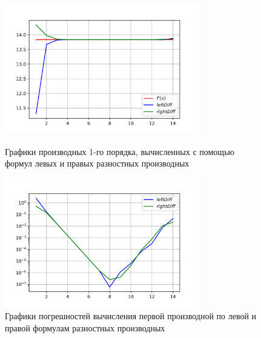 \begin{figure}[h!]
	\centering                                                                                            
	\begin{minipage}{0.45\textwidth}
	        \centering
	        \includegraphics[width=8.5cm]{images/plot_6.1_1st_deriv.png} %
	        \caption{Графики производных 1-го порядка, вычисленных с помощью формул левых и правых разностных производных}
	\end{minipage}\hfill
	\begin{minipage}{0.45\textwidth}
		\centering
		\includegraphics[width=8.5cm]{images/plot_6.1_1st_deriv_err.png} %
		\caption{Графики погрешностей вычисления первой производной  по левой и правой формулам разностных производных}
	\end{minipage}
\end{figure}

